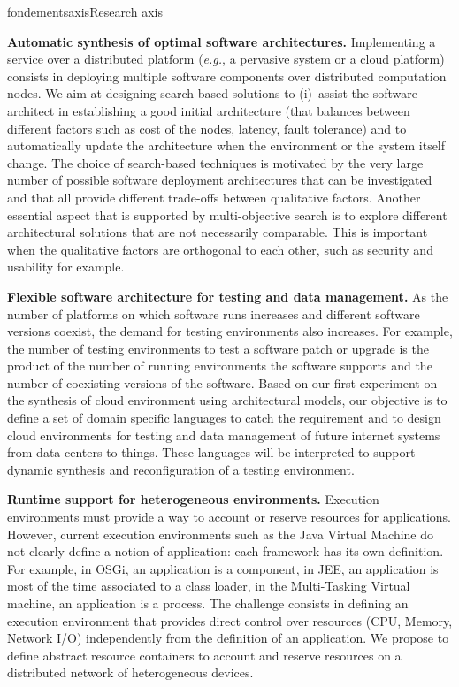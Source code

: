 \documentclass{ra2018}
\begin{document}
\begin{module}{fondements}{axis}{Research axis}
 
\textbf{Automatic synthesis of optimal software architectures.} Implementing a service over a distributed platform (\textit{e.g.}, a pervasive system or a cloud platform) consists in deploying multiple software components over distributed computation nodes. We aim at designing search-based solutions to (i)~assist the software architect in establishing a good initial architecture (that balances between different factors such as cost of the nodes, latency, fault tolerance) and to automatically update the architecture when the environment or the system itself change. The choice of search-based techniques is motivated by the very large number of possible software deployment architectures that can be investigated and that all provide different trade-offs between qualitative factors. Another essential aspect that is supported by multi-objective search is to explore different architectural solutions that are not necessarily comparable. This is important when the qualitative factors are orthogonal to each other, such as security and usability for example.

\textbf{Flexible software architecture for testing and data management.} As the number of  platforms on which software runs increases and different software versions coexist, the demand for testing environments also increases. For example, the number of testing environments to test a  software patch or upgrade is the product of the number of running environments the  software supports and the number of coexisting versions of the  software.  
Based on our first experiment on the synthesis of cloud environment using architectural models, our objective is to define a set of domain specific languages to catch the requirement and to design cloud environments for testing and data management of future internet systems from data centers to things. These languages will be interpreted to support dynamic synthesis and reconfiguration of a testing environment.

\textbf{Runtime support for heterogeneous environments.}
Execution environments must provide a way to account or reserve resources for applications. However, current execution environments such as the Java Virtual Machine do not clearly define a notion of application: each framework has its own definition. 
For example, in OSGi, an application is a component, in JEE, an application is most of the time associated to a class loader, in the Multi-Tasking Virtual machine, an application is a process. 
The challenge consists in defining an execution environment that provides direct control over resources (CPU, Memory, Network I/O) independently from the definition of an application. 
We propose to define abstract resource containers to account and reserve resources on a distributed network of heterogeneous devices.


\end{module}
\end{document}
